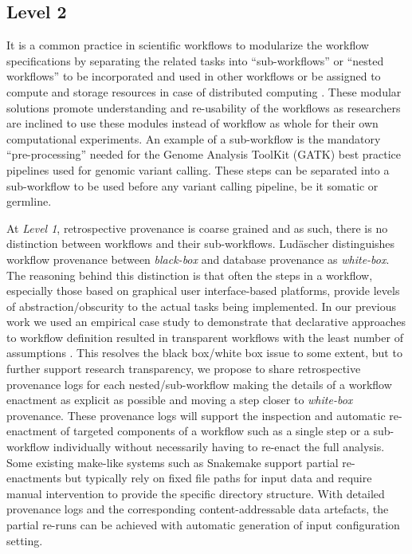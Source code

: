 \documentclass[a4paper,num-refs]{oup-contemporary}
\begin{document}
\subsection{Level 2} \label{sec:level2}
It is a common practice in scientific workflows to modularize the workflow specifications by separating the related tasks into ``sub-workflows'' or ``nested workflows'' \citep{cohen2017scientific} to be incorporated and used in other workflows or be assigned to compute and storage resources in case of distributed computing \citep{chen2011partitioning}. These modular solutions promote understanding and re-usability of the workflows as researchers are inclined to use these modules instead of workflow as whole for their own computational experiments. An example of a sub-workflow is the mandatory ``pre-processing'' \citep{GATKBP} needed for the Genome Analysis ToolKit (GATK) best practice pipelines used for genomic variant calling. These steps can be separated into a sub-workflow to be used before any variant calling pipeline, be it somatic or germline. 

At \textit{Level 1}, retrospective provenance is coarse grained and as such, there is no distinction between workflows and their sub-workflows. Ludäscher \citep{ludascher2016brief} distinguishes workflow provenance between \textit{black-box} and database provenance as \textit{white-box}. The reasoning behind this distinction is that often the steps in a workflow, especially those based on graphical user interface-based platforms, provide levels of abstraction/obscurity to the actual tasks being implemented. In our previous work we used an empirical case study to demonstrate that declarative approaches to workflow definition resulted in transparent workflows with the least number of assumptions \citep{kanwal_2017}. This resolves the black box/white box issue to some extent, but to further support research transparency, we propose to share retrospective provenance logs for each nested/sub-workflow making the details of a workflow enactment as explicit as possible and moving a step closer to \textit{white-box} provenance. These provenance logs will support the inspection and automatic re-enactment of targeted components of a workflow such as a single step or a sub-workflow individually without necessarily having to re-enact the full analysis. Some existing make-like systems such as Snakemake support partial re-enactments but typically rely on fixed file paths for input data and require manual intervention to provide the specific directory structure. With detailed provenance logs and the corresponding content-addressable data artefacts, the partial re-runs can be achieved with automatic generation of input configuration setting. 
\end{document}
